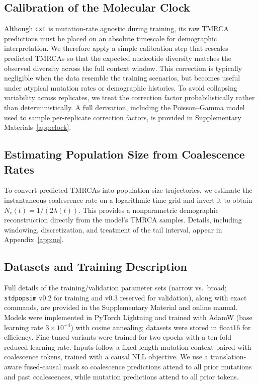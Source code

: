 \documentclass{article}
\newcommand{\cxtkit}{\texttt{cxt}\xspace}
\newcommand{\stdpopsim}{\texttt{stdpopsim}\xspace}
\begin{document}
{\subsection*{Calibration of the Molecular Clock}
\label{correction}

Although \cxtkit is mutation-rate agnostic during training, 
its raw TMRCA predictions must be placed on an absolute timescale for demographic interpretation.
We therefore apply a simple calibration step that rescales predicted TMRCAs 
so that the expected nucleotide diversity matches 
the observed diversity across the full context window. 
This correction is typically negligible when the data resemble the training scenarios, 
but becomes useful under atypical mutation rates or demographic histories. 
To avoid collapsing variability across replicates, 
we treat the correction factor probabilistically rather than deterministically. 
A full derivation, including the Poisson–Gamma model used to sample per-replicate correction factors, 
is provided in Supplementary Materials~\ref{app:clock}.

\subsection*{Estimating Population Size from Coalescence Rates}

To convert predicted TMRCAs into population size trajectories, 
we estimate the instantaneous coalescence rate on a logarithmic time grid 
and invert it to obtain $N_e(t) = 1 / (2\lambda(t))$. 
This provides a nonparametric demographic reconstruction directly from the model’s TMRCA samples. 
Details, including windowing, discretization, and treatment of the tail interval, 
appear in Appendix~\ref{app:ne}.


\subsection*{Datasets and Training Description}
\label{datasets}

Full details of the training/validation parameter sets (narrow vs.\ broad; \stdpopsim v0.2 for training and v0.3 reserved for validation), along with exact commands, are provided in the Supplementary Material and online manual. 
Models were implemented in PyTorch Lightning and trained with AdamW (base learning rate $3\times10^{-4}$) with cosine annealing; datasets were stored in float16 for efficiency. 
Fine-tuned variants were trained for two epochs with a ten-fold reduced learning rate. 
Inputs follow a fixed-length mutation context paired with coalescence tokens, trained with a causal NLL objective. 
We use a translation-aware fused-causal mask so coalescence predictions attend to all prior mutations and past coalescences, while mutation predictions attend to all prior tokens.



}
\end{document}
